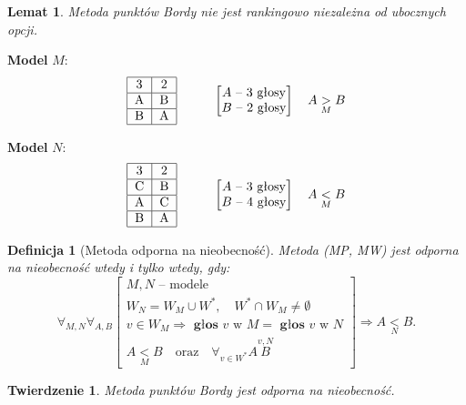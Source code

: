 \documentclass[12pt,a4paper]{article}
\theoremstyle{break}
\newtheorem{definition}{Definicja}[section]
\newtheorem{theorem}{Twierdzenie}[section]
\newtheorem{lemma}{Lemat}[section]
\begin{document}
	\begin{lemma}
		Metoda punktów Bordy nie jest rankingowo niezależna od ubocznych opcji.
	\end{lemma}
	
	\noindent \textbf{Model } $M$:
	\[
	\begin{tabular}{|c|c|}
		\hline
		3 & 2 \\ \hline
		A & B \\ \hline
		B & A \\ \hline
	\end{tabular}
	\hspace{1cm}
	\begin{bmatrix}
		A \text{ -- 3 głosy} \\
		B \text{ -- 2 głosy}
	\end{bmatrix}
	\quad A \underset{M}{>} B
	\]
	
	\noindent \textbf{Model } $N$:
	\[
	\begin{tabular}{|c|c|}
		\hline
		3 & 2 \\ \hline
		C & B \\ \hline
		A & C \\ \hline
		B & A \\ \hline
	\end{tabular}
	\hspace{1cm}
	\begin{bmatrix}
		A \text{ -- 3 głosy} \\
		B \text{ -- 4 głosy}
	\end{bmatrix}
	\quad A \underset{M}{<} B
	\]
	\begin{definition}[Metoda odporna na nieobecność]
		Metoda (MP, MW) jest odporna na nieobecność wtedy i tylko wtedy, gdy:
		\[
		\forall_{M,N} \forall_{A,B} 
		\begin{bmatrix}
			M, N \text{ -- modele} \\
			W_N = W_M \cup W^*, \quad W^* \cap W_M \neq \emptyset \\
			v \in W_M \Rightarrow \textbf{ głos } v \text{ w } M = \textbf{ głos } v \text{ w } N \\
			A \underset{M}{<} B \quad \text{oraz} \quad \forall_{v \in W^*} A \overset{v,N}{B}
		\end{bmatrix}
		\Rightarrow A \underset{N}{<} B.
		\]
	\end{definition}
	
	\begin{theorem}
		Metoda punktów Bordy jest odporna na nieobecność.
	\end{theorem}
	
\end{document}
